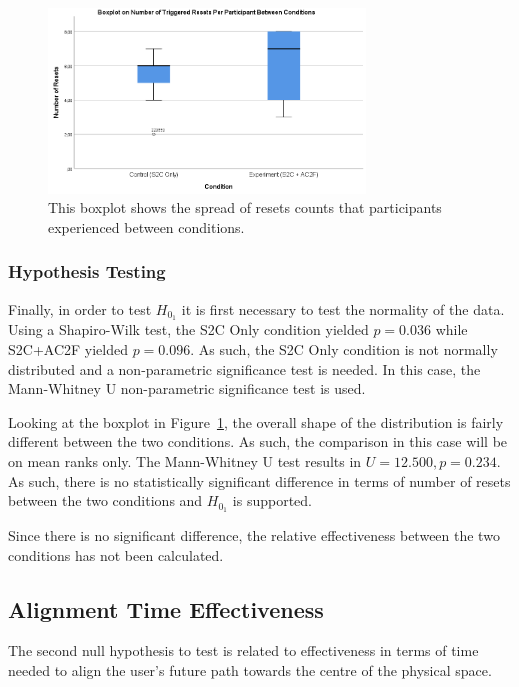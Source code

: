 \begin{figure}[tbph]
    \centering
    \includegraphics[width=0.75\textwidth]{figures/graphs/resetCountBoxPlot.png}
    \caption[Boxplot on Number of Resets Per Participant Between Conditions for Experiment 2]{This boxplot shows the spread of resets counts that participants experienced between conditions.}
    \label{fig:ex2resetboxplot}
\end{figure}

\subsubsection{Hypothesis Testing}
Finally, in order to test $H_{0_1}$ it is first necessary to test the normality of the data. Using a Shapiro-Wilk test, the S2C Only condition yielded $p = 0.036$ while S2C+AC2F yielded $p = 0.096$. As such, the S2C Only condition is not normally distributed and a non-parametric significance test is needed. In this case, the Mann-Whitney U non-parametric significance test is used. 

Looking at the boxplot in Figure~\ref{fig:ex2resetboxplot}, the overall shape of the distribution is fairly different between the two conditions. As such, the comparison in this case will be on mean ranks only. The Mann-Whitney U test results in $U = 12.500, p = 0.234$. As such, there is no statistically significant difference in terms of number of resets between the two conditions and $H_{0_1}$ is supported.

Since there is no significant difference, the relative effectiveness between the two conditions has not been calculated.

\subsection{Alignment Time Effectiveness}
The second null hypothesis to test is related to effectiveness in terms of time needed to align the user's future path towards the centre of the physical space. 

